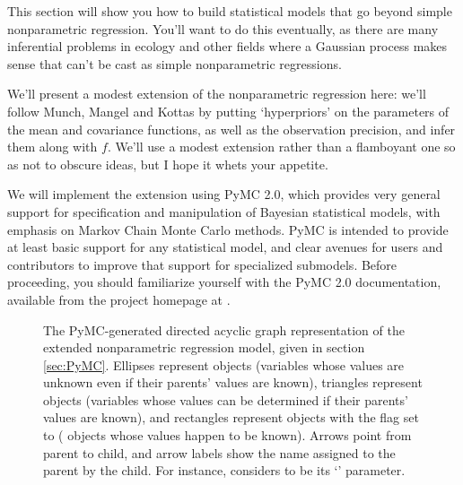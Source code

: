 \documentclass{manual}
\begin{document}
This section will show you how to build statistical models that go beyond simple nonparametric regression. You'll want to do this eventually, as there are many inferential problems in ecology and other fields where a Gaussian process makes sense that can't be cast as simple nonparametric regressions. 

We'll present a modest extension of the nonparametric regression here: we'll follow Munch, Mangel and Kottas by putting `hyperpriors' on the parameters of the mean and covariance functions, as well as the observation precision, and infer them along with $f$. We'll use a modest extension rather than a flamboyant one so as not to obscure ideas, but I hope it whets your appetite.

We will implement the extension using PyMC 2.0, which provides very general support for specification and manipulation of Bayesian statistical models, with emphasis on Markov Chain Monte Carlo methods. PyMC is intended to provide at least basic support for any statistical model, and clear avenues for users and contributors to improve that support for specialized submodels. Before proceeding, you should familiarize yourself with the PyMC 2.0 documentation, available from the project homepage at .

\begin{figure}
	\centering
	\caption{The PyMC-generated directed acyclic graph representation of the extended nonparametric regression model, given in section \ref{sec:PyMC}. Ellipses represent  objects (variables whose values are unknown even if their parents' values are known), triangles represent  objects (variables whose values can be determined if their parents' values are known), and rectangles represent  objects with the  flag set to  ( objects whose values happen to be known). Arrows point from parent to child, and arrow labels show the name assigned to the parent by the child. For instance,  considers  to be its `' parameter.}
	\label{fig:unobservedModel}
\end{figure}
\end{document}
